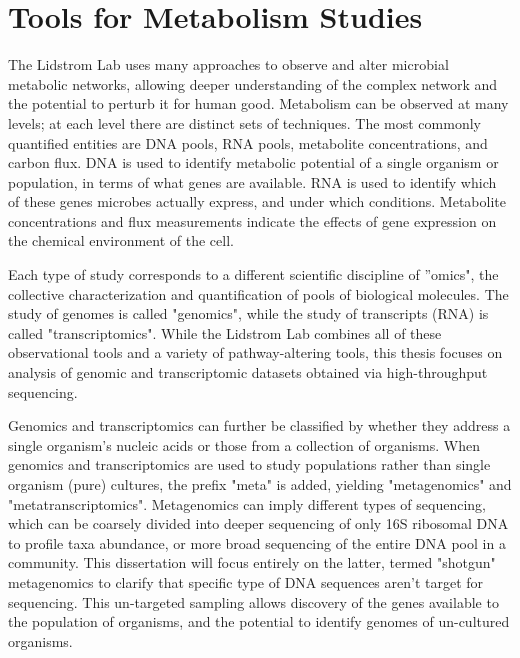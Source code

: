 \section{Tools for Metabolism Studies}
The Lidstrom Lab uses many approaches to observe and alter microbial metabolic networks, allowing deeper understanding of the complex network and the potential to perturb it for human good.
Metabolism can be observed at many levels; at each level there are distinct sets of techniques. %
The most commonly quantified entities are DNA pools, RNA pools, metabolite concentrations, and carbon flux.
DNA is used to identify metabolic potential of a single organism or population, in terms of what genes are available.
RNA is used to identify which of these genes microbes actually express, and under which conditions.
Metabolite concentrations and flux measurements indicate the effects of gene expression on the chemical environment of the cell.

Each type of study corresponds to a different scientific discipline of ''omics", the collective characterization and quantification of pools of biological molecules.
The study of genomes is called "genomics", while the study of transcripts (RNA) is called "transcriptomics".
While the Lidstrom Lab combines all of these observational tools and a variety of pathway-altering tools, this thesis focuses on analysis of genomic and transcriptomic datasets obtained via high-throughput sequencing.


Genomics and transcriptomics can further be classified by whether they address a single organism's nucleic acids or those from a collection of organisms.
When genomics and transcriptomics are used to study populations rather than single organism (pure) cultures, the prefix "meta" is added, yielding "metagenomics" and "metatranscriptomics".
Metagenomics can imply different types of sequencing, which can be coarsely divided into deeper sequencing of only 16S ribosomal DNA to profile taxa abundance, or more broad sequencing of the entire DNA pool in a community.
This dissertation will focus entirely on the latter, termed "shotgun" metagenomics to clarify that specific type of DNA sequences aren't target for sequencing.
This un-targeted sampling allows discovery of the genes available to the population of organisms, and the potential to identify genomes of un-cultured organisms.

